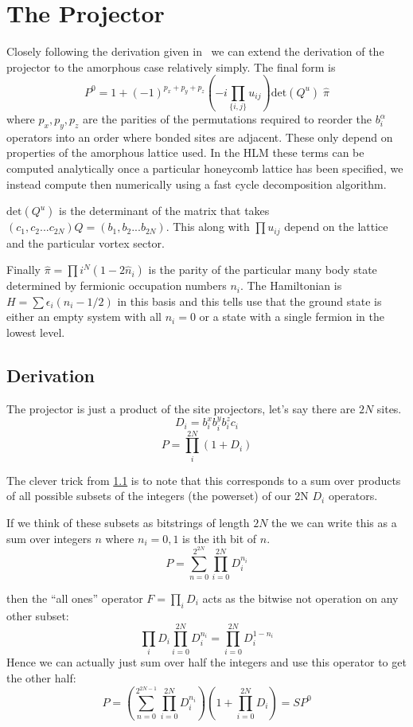\section{The Projector}
Closely following the derivation given in~\cite{} we can extend the derivation of the projector to the amorphous case relatively simply. The final form is
\[P^0 = 1 + (-1)^{p_x + p_y + p_z} \left(-i \prod_{\{i,j\}} u_{ij}\right) \mathrm{det}(Q^u) \; \hat{\pi} \] 
where \(p_x,p_y,p_z\) are the parities of the permutations required to reorder the \(b^\alpha_i\) operators into an order where bonded sites are adjacent. These only depend on properties of the amorphous lattice used. In the HLM these terms can be computed analytically once a particular honeycomb lattice has been specified, we instead compute then numerically using a fast cycle decomposition algorithm.

\(\mathrm{det}(Q^u)\) is the determinant of the matrix that takes \((c_1, c_2... c_{2N}) Q = (b_1, b_2... b_{2N})\). This along with \(\prod u_{ij}\) depend on the lattice and the particular vortex sector. 

Finally \(\hat{\pi} = \prod{i}^{N} (1 - 2\hat{n}_i)\) is the parity of the particular many body state determined by fermionic occupation numbers \(n_i\). The Hamiltonian is \(H = \sum \epsilon_i (n_i - 1/2)\) in this basis and this tells use that the ground state is either an empty system with all \(n_i = 0\) or a state with a single fermion in the lowest level. 

\subsection{Derivation}
The projector is just a product of the site projectors, let's say there are \(2N\) sites.
\[D_i = b^x_i b^y_i b^z_i c_i \]
\[P = \prod_i^{2N} (1 + D_i)\]

The clever trick from \ref{} is to note that this corresponds to a sum over products of all possible subsets of the integers (the powerset) of our 2N \(D_i\) operators. 

If we think of these subsets as bitstrings of length \(2N\) the we can write this as a sum over integers \(n\) where \(n_i = 0,1\) is the ith bit of \(n\).
\[P = \sum_{n = 0}^{2^{2N}} \prod_{i=0}^{2N} D_i^{n_i}\]

then the ``all ones'' operator \(F = \prod_i D_i\) acts as the bitwise not operation on any other subset:
\[ \prod_i D_i \prod_{i=0}^{2N} D_i^{n_i} = \prod_{i=0}^{2N} D_i^{1 - n_i}\]
Hence we can actually just sum over half the integers and use this operator to get the other half:
\[P = \left(\sum_{n = 0}^{2^{2N - 1}} \prod_{i=0}^{2N} D_i^{n_i} \right) (1 + \prod_{i=0}^{2N} D_i) = S P^0\]

